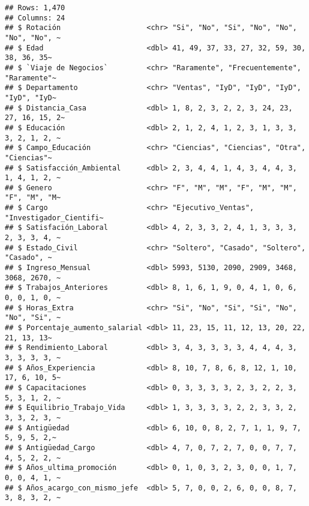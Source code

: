\documentclass[
]{article}
\newenvironment{Shaded}{\begin{snugshade}}{\end{snugshade}}
\newcommand{\DecValTok}[1]{\textcolor[rgb]{0.00,0.00,0.81}{#1}}
\newcommand{\FunctionTok}[1]{\textcolor[rgb]{0.13,0.29,0.53}{\textbf{#1}}}
\newcommand{\NormalTok}[1]{#1}
\newcommand{\OtherTok}[1]{\textcolor[rgb]{0.56,0.35,0.01}{#1}}
\newcommand{\SpecialCharTok}[1]{\textcolor[rgb]{0.81,0.36,0.00}{\textbf{#1}}}
\newcommand{\StringTok}[1]{\textcolor[rgb]{0.31,0.60,0.02}{#1}}
\begin{document}
\begin{verbatim}
## Rows: 1,470
## Columns: 24
## $ Rotación                    <chr> "Si", "No", "Si", "No", "No", "No", "No", ~
## $ Edad                        <dbl> 41, 49, 37, 33, 27, 32, 59, 30, 38, 36, 35~
## $ `Viaje de Negocios`         <chr> "Raramente", "Frecuentemente", "Raramente"~
## $ Departamento                <chr> "Ventas", "IyD", "IyD", "IyD", "IyD", "IyD~
## $ Distancia_Casa              <dbl> 1, 8, 2, 3, 2, 2, 3, 24, 23, 27, 16, 15, 2~
## $ Educación                   <dbl> 2, 1, 2, 4, 1, 2, 3, 1, 3, 3, 3, 2, 1, 2, ~
## $ Campo_Educación             <chr> "Ciencias", "Ciencias", "Otra", "Ciencias"~
## $ Satisfacción_Ambiental      <dbl> 2, 3, 4, 4, 1, 4, 3, 4, 4, 3, 1, 4, 1, 2, ~
## $ Genero                      <chr> "F", "M", "M", "F", "M", "M", "F", "M", "M~
## $ Cargo                       <chr> "Ejecutivo_Ventas", "Investigador_Cientifi~
## $ Satisfación_Laboral         <dbl> 4, 2, 3, 3, 2, 4, 1, 3, 3, 3, 2, 3, 3, 4, ~
## $ Estado_Civil                <chr> "Soltero", "Casado", "Soltero", "Casado", ~
## $ Ingreso_Mensual             <dbl> 5993, 5130, 2090, 2909, 3468, 3068, 2670, ~
## $ Trabajos_Anteriores         <dbl> 8, 1, 6, 1, 9, 0, 4, 1, 0, 6, 0, 0, 1, 0, ~
## $ Horas_Extra                 <chr> "Si", "No", "Si", "Si", "No", "No", "Si", ~
## $ Porcentaje_aumento_salarial <dbl> 11, 23, 15, 11, 12, 13, 20, 22, 21, 13, 13~
## $ Rendimiento_Laboral         <dbl> 3, 4, 3, 3, 3, 3, 4, 4, 4, 3, 3, 3, 3, 3, ~
## $ Años_Experiencia            <dbl> 8, 10, 7, 8, 6, 8, 12, 1, 10, 17, 6, 10, 5~
## $ Capacitaciones              <dbl> 0, 3, 3, 3, 3, 2, 3, 2, 2, 3, 5, 3, 1, 2, ~
## $ Equilibrio_Trabajo_Vida     <dbl> 1, 3, 3, 3, 3, 2, 2, 3, 3, 2, 3, 3, 2, 3, ~
## $ Antigüedad                  <dbl> 6, 10, 0, 8, 2, 7, 1, 1, 9, 7, 5, 9, 5, 2,~
## $ Antigüedad_Cargo            <dbl> 4, 7, 0, 7, 2, 7, 0, 0, 7, 7, 4, 5, 2, 2, ~
## $ Años_ultima_promoción       <dbl> 0, 1, 0, 3, 2, 3, 0, 0, 1, 7, 0, 0, 4, 1, ~
## $ Años_acargo_con_mismo_jefe  <dbl> 5, 7, 0, 0, 2, 6, 0, 0, 8, 7, 3, 8, 3, 2, ~
\end{verbatim}

\begin{Shaded}
\end{Shaded}
\end{document}
